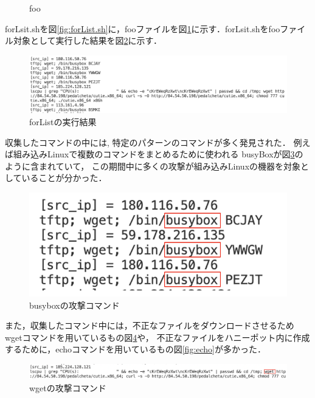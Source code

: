 \documentclass[dvipdfmx]{bta}
\begin{document}
\begin{figure}[htbp]

	
	\caption{foo}\label{fig:foo}
	
\end{figure}

forLsit.shを図\ref{fig:forList.sh}に，fooファイルを図\ref{fig:foo}に示す．forLsit.shをfooファイル対象として実行した結果を図\ref{fig:forresult}に示す．
\begin{figure}[htbp]

	\centering
 	\includegraphics[scale=0.7]{forresult.png}
	\caption{forListの実行結果}\label{fig:forresult}
	
\end{figure}

収集したコマンドの中には,
特定のパターンのコマンドが多く発見された．
例えば組み込みLinuxで複数のコマンドをまとめるために使われる
busyBoxが図\ref{fig:busybox}のように含まれていて，
この期間中に多くの攻撃が組み込みLinuxの機器を対象としていることが分かった．

\begin{figure}[htbp]

	\centering
 	\includegraphics[scale=0.7]{busybox.png}
	\caption{busyboxの攻撃コマンド}\label{fig:busybox}
	
\end{figure}

また，収集したコマンド中には，不正なファイルをダウンロードさせるためwgetコマンドを用いているもの図\ref{fig:wget}や，
不正なファイルをハニーポット内に作成するために，echoコマンドを用いているもの図\ref{fig:echo}が多かった．
\begin{figure}[htbp]

	\centering
 	\includegraphics[scale=0.7]{wget.png}
	\caption{wgetの攻撃コマンド}\label{fig:wget}
	
\end{figure}
\end{document}
